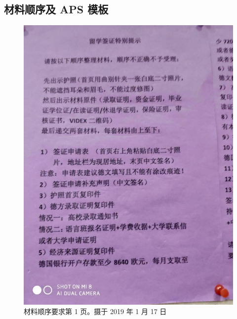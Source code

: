 \documentclass[final]{book}
\begin{document}
\begin{appendices}



\section{材料顺序及 APS 模板}
\begin{figure}[htbp]
  \centering
  \includegraphics[width=\textwidth]{order-1}
  \caption{材料顺序要求第 1 页。摄于 2019 年 1 月 17 日}
  \label{fig:order-1}
\end{figure}
\begin{figure}[htbp]
  \centering

\end{figure}
\end{appendices}
\end{document}

